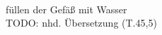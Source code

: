 \begin{exe}
\ex \label{ex:T9634} \gll {}      \\
{füllen} {der} {Gefäß} {mit} {Wasser} {}\\
\glt TODO: nhd. Übersetzung (T.45,5)
\end{exe}
